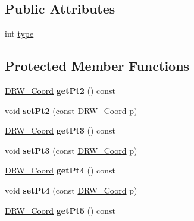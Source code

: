\subsection*{Public Attributes}
\begin{DoxyCompactItemize}
\item 
int \hyperlink{classDRW__Dimension_ad3af7cb327656cb2c1c33a00d26ed933}{type}
\end{DoxyCompactItemize}
\subsection*{Protected Member Functions}
\begin{DoxyCompactItemize}
\item 
\hypertarget{classDRW__Dimension_a13121a65e8e0e48c44e91e4b748d690a}{\hyperlink{classDRW__Coord}{D\-R\-W\-\_\-\-Coord} {\bfseries get\-Pt2} () const }\label{classDRW__Dimension_a13121a65e8e0e48c44e91e4b748d690a}

\item 
\hypertarget{classDRW__Dimension_a03db8932d1fa3fc750458e346ddb8499}{void {\bfseries set\-Pt2} (const \hyperlink{classDRW__Coord}{D\-R\-W\-\_\-\-Coord} p)}\label{classDRW__Dimension_a03db8932d1fa3fc750458e346ddb8499}

\item 
\hypertarget{classDRW__Dimension_aacd2e27b314a6cdd3a13a0711b62d198}{\hyperlink{classDRW__Coord}{D\-R\-W\-\_\-\-Coord} {\bfseries get\-Pt3} () const }\label{classDRW__Dimension_aacd2e27b314a6cdd3a13a0711b62d198}

\item 
\hypertarget{classDRW__Dimension_a7dcf6c2c343d4c223a1d7a801b8f705d}{void {\bfseries set\-Pt3} (const \hyperlink{classDRW__Coord}{D\-R\-W\-\_\-\-Coord} p)}\label{classDRW__Dimension_a7dcf6c2c343d4c223a1d7a801b8f705d}

\item 
\hypertarget{classDRW__Dimension_a941c4efc5f6d06b85b9cedb310a37579}{\hyperlink{classDRW__Coord}{D\-R\-W\-\_\-\-Coord} {\bfseries get\-Pt4} () const }\label{classDRW__Dimension_a941c4efc5f6d06b85b9cedb310a37579}

\item 
\hypertarget{classDRW__Dimension_add7059efdbc2dc51e27014c313f762a3}{void {\bfseries set\-Pt4} (const \hyperlink{classDRW__Coord}{D\-R\-W\-\_\-\-Coord} p)}\label{classDRW__Dimension_add7059efdbc2dc51e27014c313f762a3}

\item 
\hypertarget{classDRW__Dimension_a0e4da49693e65a5a466189eb784cb48b}{\hyperlink{classDRW__Coord}{D\-R\-W\-\_\-\-Coord} {\bfseries get\-Pt5} () const }\label{classDRW__Dimension_a0e4da49693e65a5a466189eb784cb48b}


\end{DoxyCompactItemize}
